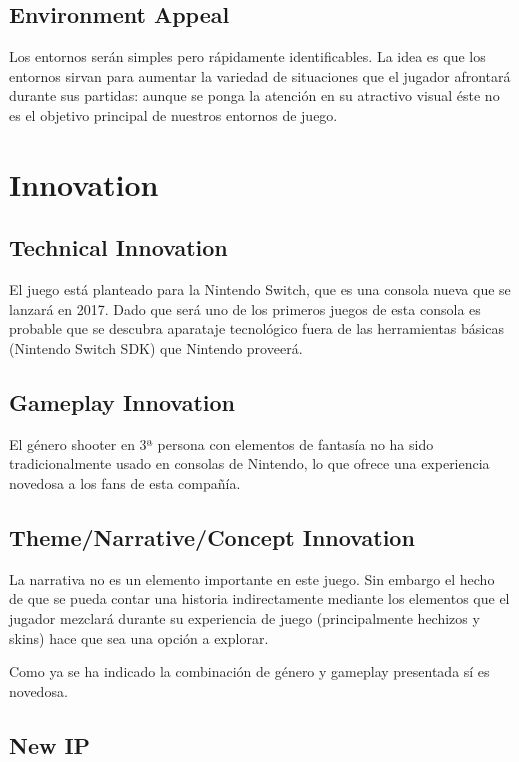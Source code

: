 \documentclass[12pt]{article}
\begin{document}
\subsection{Environment Appeal}

Los entornos serán simples pero rápidamente identificables. La idea es que los entornos sirvan para aumentar la variedad de situaciones que el jugador afrontará durante sus partidas: aunque se ponga la atención en su atractivo visual éste no es el objetivo principal de nuestros entornos de juego.

\newpage  

\section{Innovation}        

\subsection{Technical Innovation}

El juego está planteado para la Nintendo Switch, que es una consola nueva que se lanzará en 2017. Dado que será uno de los primeros juegos de esta consola es probable que se descubra aparataje tecnológico fuera de las herramientas básicas (Nintendo Switch SDK) que Nintendo proveerá.

\subsection{Gameplay Innovation}

El género shooter en 3ª persona con elementos de fantasía no ha sido tradicionalmente usado en consolas de Nintendo, lo que ofrece una experiencia novedosa a los fans de esta compañía.

\subsection{Theme/Narrative/Concept Innovation}

La narrativa no es un elemento importante en este juego. Sin embargo el hecho de que se pueda contar una historia indirectamente mediante los elementos que el jugador mezclará durante su experiencia de juego (principalmente hechizos y skins) hace que sea una opción a explorar.

Como ya se ha indicado la combinación de género y gameplay presentada sí es novedosa.

\subsection{New IP}
\end{document}
